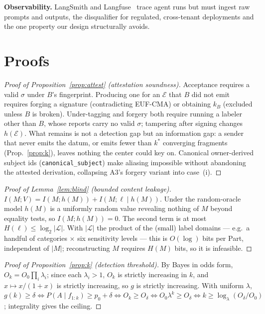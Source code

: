 \documentclass{article}
\begin{document}
\noindent\textbf{Observability.} LangSmith and Langfuse~\citep{langfuse} trace
agent runs but must ingest raw prompts and outputs, the disqualifier for
regulated, cross-tenant deployments and the one property our design structurally
avoids.






\appendix
\section{Proofs}
\begin{proof}[Proof of Proposition~\ref{prop:attest} (attestation soundness)]
Acceptance requires a valid $\sigma$ under $B$'s fingerprint. Producing one for an
$\mathcal{E}$ that $B$ did not emit requires forging a signature (contradicting
EUF-CMA) or obtaining $k_B$ (excluded unless $B$ is broken). Under-tagging and forgery
both require running a labeler other than $B$, whose reports carry no valid $\sigma$;
tampering after signing changes $h(\mathcal{E})$. What remains is not a detection gap
but an information gap: a sender that never emits the datum, or emits fewer than
$k^{*}$ converging fragments (Prop.~\ref{prop:k}), leaves nothing the center could key
on. Canonical owner-derived subject ids (\texttt{canonical\_subject}) make aliasing
impossible without abandoning the attested derivation, collapsing A3's forgery variant
into case~(i).
\end{proof}
\begin{proof}[Proof of Lemma~\ref{lem:blind} (bounded content leakage)]
$I(M;V)=I(M;h(M))+I(M;\ell\mid h(M))$. Under the random-oracle model $h(M)$ is a
uniformly random value revealing nothing of $M$ beyond equality tests, so
$I(M;h(M))=0$. The second term is at most $H(\ell)\le\log_2|\mathcal{L}|$. With
$|\mathcal{L}|$ the product of the (small) label domains --- e.g.\ a handful of
categories $\times$ six sensitivity levels --- this is $O(\log)$ bits per Part,
independent of $|M|$; reconstructing $M$ requires $H(M)$ bits, so it is infeasible.
\end{proof}
\begin{proof}[Proof of Proposition~\ref{prop:k} (detection threshold)]
By Bayes in odds form, $O_k=O_0\prod_i\lambda_i$; since each $\lambda_i>1$, $O_k$
is strictly increasing in $k$, and $x\mapsto x/(1+x)$ is strictly increasing, so
$g$ is strictly increasing. With uniform $\lambda$, $g(k)\ge\delta \iff
P(A\mid f_{1:k})\ge p_0+\delta \iff O_k\ge O_\delta \iff O_0\lambda^{k}\ge O_\delta
\iff k\ge\log_\lambda(O_\delta/O_0)$; integrality gives the ceiling.
\end{proof}
\end{document}

